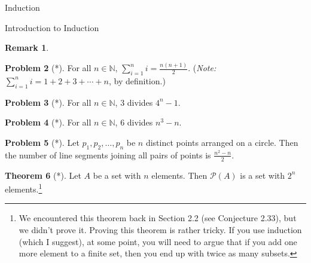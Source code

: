 \documentclass[11pt]{article}
\theoremstyle{definition}
\newtheorem{theorem}{Theorem}[section]
\newtheorem{problem}[theorem]{Problem}
\newtheorem{remark}[theorem]{Remark}
\begin{document}
\begin{section}{Induction}
\begin{subsection}{Introduction to Induction}
\begin{remark}
\end{remark}

\begin{problem}[*]
For all $n\in\mathbb{N}$, $\displaystyle \sum_{i=1}^{n}i=\frac{n(n+1)}{2}$.  (\emph{Note:} $\displaystyle \sum_{i=1}^{n}i=1+2+3+\cdots +n$, by definition.)
\end{problem}

\begin{problem}[*]
For all $n\in\mathbb{N}$, 3 divides $4^{n}-1$.
\end{problem}

\begin{problem}[*]
For all $n\in\mathbb{N}$, 6 divides $n^{3}-n$.
\end{problem}

\begin{problem}[*]
Let $p_{1}, p_{2}, \ldots, p_{n}$ be $n$ distinct points arranged on a circle.  Then the number of line segments joining all pairs of points is $\frac{n^{2}-n}{2}$.
\end{problem}

\begin{theorem}[*]
Let $A$ be a set with $n$ elements.  Then $\mathcal{P}(A)$ is a set with $2^{n}$ elements.\footnote{We encountered this theorem back in Section 2.2 (see Conjecture 2.33), but we didn't prove it.  Proving this theorem is rather tricky.  If you use induction (which I suggest), at some point, you will need to argue that if you add one more element to a finite set, then you end up with twice as many subsets.}
\end{theorem}

\end{subsection}

\end{section}
\end{document}
